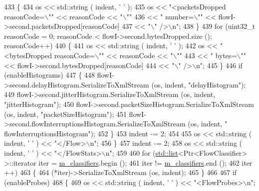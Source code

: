 \begin{DoxyCode}
433         \{
434           os << std::string ( indent, \textcolor{charliteral}{' '} );
435           os << \textcolor{stringliteral}{"<packetsDropped reasonCode=\(\backslash\)""} << reasonCode << \textcolor{stringliteral}{"\(\backslash\)""}
436           << \textcolor{stringliteral}{" number=\(\backslash\)""} << flowI->second.packetsDropped[reasonCode]
437           << \textcolor{stringliteral}{"\(\backslash\)" />\(\backslash\)n"};
438         \}
439       \textcolor{keywordflow}{for} (uint32\_t reasonCode = 0; reasonCode < flowI->second.bytesDropped.size (); reasonCode++)
440         \{
441           os << std::string ( indent, \textcolor{charliteral}{' '} );
442           os << \textcolor{stringliteral}{"<bytesDropped reasonCode=\(\backslash\)""} << reasonCode << \textcolor{stringliteral}{"\(\backslash\)""}
443           << \textcolor{stringliteral}{" bytes=\(\backslash\)""} << flowI->second.bytesDropped[reasonCode]
444           << \textcolor{stringliteral}{"\(\backslash\)" />\(\backslash\)n"};
445         \}
446       \textcolor{keywordflow}{if} (enableHistograms)
447         \{
448           flowI->second.delayHistogram.SerializeToXmlStream (os, indent, \textcolor{stringliteral}{"delayHistogram"});
449           flowI->second.jitterHistogram.SerializeToXmlStream (os, indent, \textcolor{stringliteral}{"jitterHistogram"});
450           flowI->second.packetSizeHistogram.SerializeToXmlStream (os, indent, \textcolor{stringliteral}{"packetSizeHistogram"});
451           flowI->second.flowInterruptionsHistogram.SerializeToXmlStream (os, indent, \textcolor{stringliteral}{"
      flowInterruptionsHistogram"});
452         \}
453       indent -= 2;
454 
455       os << std::string ( indent, \textcolor{charliteral}{' '} ) << \textcolor{stringliteral}{"</Flow>\(\backslash\)n"};
456     \}
457   indent -= 2;
458   os << std::string ( indent, \textcolor{charliteral}{' '} ) << \textcolor{stringliteral}{"</FlowStats>\(\backslash\)n"};
459 
460   \textcolor{keywordflow}{for} (\hyperlink{openflow-interface_8h_afd9bcfa176617760671b67580f536fa7}{std::list}<Ptr<FlowClassifier> >::iterator iter = \hyperlink{classns3_1_1FlowMonitor_a5a4e22e2b8a08b926f5f054ae082a60b}{m\_classifiers}.begin ();
461       iter != \hyperlink{classns3_1_1FlowMonitor_a5a4e22e2b8a08b926f5f054ae082a60b}{m\_classifiers}.end ();
462       iter ++)
463     \{
464       (*iter)->SerializeToXmlStream (os, indent);
465     \}
466 
467   \textcolor{keywordflow}{if} (enableProbes)
468     \{
469       os << std::string ( indent, \textcolor{charliteral}{' '} ) << \textcolor{stringliteral}{"<FlowProbes>\(\backslash\)n"};

\end{DoxyCode}
